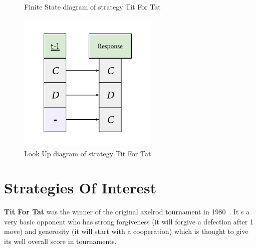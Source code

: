 \begin{figure}[ht]
    \centering
    \begin{minipage}{0.48\textwidth}
        \centering
        \caption{Finite State diagram of strategy Tit For Tat}\label{fig:tit_for_tat_FSD}
    \end{minipage}\hfill
    \begin{minipage}{0.48\textwidth}
        \centering
        \includegraphics[width=0.6\textwidth, center]{./img/examples/tit_for_tat_LUD.pdf}
        \caption{Look Up diagram of strategy Tit For Tat}\label{fig:tit_for_tat_LUD}
    \end{minipage}
\end{figure}

\section{Strategies Of Interest}\label{sec:strategiesOfInterest}
\textbf{Tit For Tat} was the winner of the original axelrod tournament in 1980~\cite{axelrod1980effective}. It s a very basic opponent who has strong forgiveness (it will forgive a defection after 1 move) and generosity (it will start with a cooperation) which is thought to give its well overall score in tournaments.

